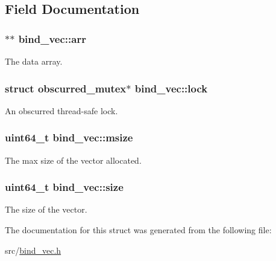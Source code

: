\subsection{Field Documentation}
\subsubsection[{\texorpdfstring{arr}{arr}}]{$\ast$$\ast$ bind\+\_\+vec\+::arr}\hypertarget{structbind__vec_a8bf39e88ad9a1715c7e6cfa4fa8028f4}{}\label{structbind__vec_a8bf39e88ad9a1715c7e6cfa4fa8028f4}


The data array. 

\subsubsection[{\texorpdfstring{lock}{lock}}]{\setlength{\rightskip}{0pt plus 5cm}struct {\bf obscurred\+\_\+mutex}$\ast$ bind\+\_\+vec\+::lock}\hypertarget{structbind__vec_aed0bfcaa51d41aa82c371ab9aad863a6}{}\label{structbind__vec_aed0bfcaa51d41aa82c371ab9aad863a6}


An obscurred thread-\/safe lock. 

\subsubsection[{\texorpdfstring{msize}{msize}}]{\setlength{\rightskip}{0pt plus 5cm}uint64\+\_\+t bind\+\_\+vec\+::msize}\hypertarget{structbind__vec_aa45fa0f2e32261123f693541f26fc12b}{}\label{structbind__vec_aa45fa0f2e32261123f693541f26fc12b}


The max size of the vector allocated. 

\subsubsection[{\texorpdfstring{size}{size}}]{\setlength{\rightskip}{0pt plus 5cm}uint64\+\_\+t bind\+\_\+vec\+::size}\hypertarget{structbind__vec_a322fa9fd253719971508bf013a668a64}{}\label{structbind__vec_a322fa9fd253719971508bf013a668a64}


The size of the vector. 



The documentation for this struct was generated from the following file\+:\begin{DoxyCompactItemize}
\item 
src/\hyperlink{bind__vec_8h}{bind\+\_\+vec.\+h}\end{DoxyCompactItemize}
